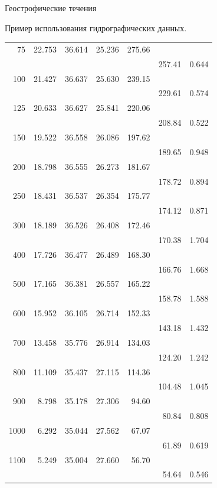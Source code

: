 \begin{chapter}{Геострофические течения}
\begin{section}{Пример использования гидрографических данных.}
\begin{table}[t!]
\begin{small}
\begin{center}
\begin{tabular}{rrrrrrl}
75& 22.753& 36.614& 25.236& 275.66& \\
 &            &       &       &       & 257.41& 0.644\\
100&    21.427& 36.637& 25.630& 239.15& \\
 &            &       &       &       & 229.61& 0.574\\
125&    20.633& 36.627& 25.841& 220.06& \\
 &            &       &       &       & 208.84& 0.522\\
150&    19.522& 36.558& 26.086& 197.62& \\
 &            &       &       &       & 189.65& 0.948\\
200&    18.798& 36.555& 26.273& 181.67& \\
 &            &       &       &       & 178.72& 0.894\\
250&    18.431& 36.537& 26.354& 175.77& \\
 &            &       &       &       & 174.12& 0.871\\
300&    18.189& 36.526& 26.408& 172.46& \\
 &            &       &       &       & 170.38& 1.704\\
400&    17.726& 36.477& 26.489& 168.30& \\
 &            &       &       &       & 166.76& 1.668\\
500&    17.165& 36.381& 26.557& 165.22& \\
 &            &       &       &       & 158.78& 1.588\\
600&    15.952& 36.105& 26.714& 152.33& \\
 &            &       &       &       & 143.18& 1.432\\
700&    13.458& 35.776& 26.914& 134.03& \\
 &            &       &       &       & 124.20& 1.242\\
800&    11.109& 35.437& 27.115& 114.36& \\
 &            &       &       &       & 104.48& 1.045\\
900&    8.798&  35.178& 27.306& 94.60&  \\
 &            &       &       &       & 80.84&  0.808\\
1000&   6.292&  35.044& 27.562& 67.07&  \\
 &            &       &       &       & 61.89&  0.619\\
1100&   5.249&  35.004& 27.660& 56.70&  \\
 &            &       &       &       & 54.64&  0.546\\

\end{tabular}
\end{center}
\end{small}
\end{table}
\end{section}
\end{chapter}
